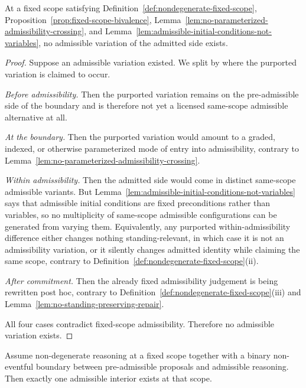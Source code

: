 \begin{lemma}\label{lem:no-admissible-variation-fixed-scope}
At a fixed scope satisfying Definition~\ref{def:nondegenerate-fixed-scope}, Proposition~\ref{prop:fixed-scope-bivalence}, Lemma~\ref{lem:no-parameterized-admissibility-crossing}, and Lemma~\ref{lem:admissible-initial-conditions-not-variables}, no admissible variation of the admitted side exists.
\end{lemma}

\begin{proof}
Suppose an admissible variation existed. We split by where the purported variation is claimed to occur.

\emph{Before admissibility.} Then the purported variation remains on the pre-admissible side of the boundary and is therefore not yet a licensed same-scope admissible alternative at all.

\emph{At the boundary.} Then the purported variation would amount to a graded, indexed, or otherwise parameterized mode of entry into admissibility, contrary to Lemma~\ref{lem:no-parameterized-admissibility-crossing}.

\emph{Within admissibility.} Then the admitted side would come in distinct same-scope admissible variants. But Lemma~\ref{lem:admissible-initial-conditions-not-variables} says that admissible initial conditions are fixed preconditions rather than variables, so no multiplicity of same-scope admissible configurations can be generated from varying them. Equivalently, any purported within-admissibility difference either changes nothing standing-relevant, in which case it is not an admissibility variation, or it silently changes admitted identity while claiming the same scope, contrary to Definition~\ref{def:nondegenerate-fixed-scope}(ii).

\emph{After commitment.} Then the already fixed admissibility judgement is being rewritten post hoc, contrary to Definition~\ref{def:nondegenerate-fixed-scope}(iii) and Lemma~\ref{lem:no-standing-preserving-repair}.

All four cases contradict fixed-scope admissibility. Therefore no admissible variation exists.
\end{proof}

\begin{theorem}\label{thm:unique-admissible-interior-fixed-scope}
Assume non-degenerate reasoning at a fixed scope together with a binary non-eventful boundary between pre-admissible proposals and admissible reasoning. Then exactly one admissible interior exists at that scope.
\end{theorem}

